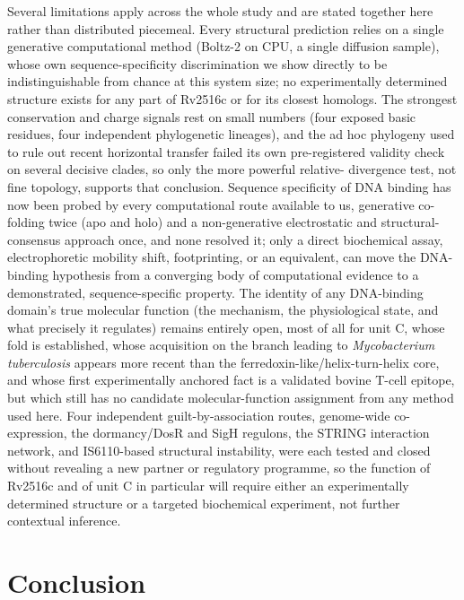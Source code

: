 \documentclass[11pt,a4paper]{article}
\newcommand{\mtb}{\textit{Mycobacterium tuberculosis}}
\begin{document}
Several limitations apply across the whole study and are stated together here rather than
distributed piecemeal. Every structural prediction relies on a single generative computational
method (Boltz-2 on CPU, a single diffusion sample), whose own sequence-specificity discrimination we
show directly to be indistinguishable from chance at this system size; no experimentally determined
structure exists for any part of Rv2516c or for its closest homologs. The strongest conservation and
charge signals rest on small numbers (four exposed basic residues, four independent phylogenetic
lineages), and the ad hoc phylogeny used to rule out recent horizontal transfer failed its own
pre-registered validity check on several decisive clades, so only the more powerful relative-
divergence test, not fine topology, supports that conclusion. Sequence specificity of DNA binding
has now been probed by every computational route available to us, generative co-folding twice
(apo and holo) and a non-generative electrostatic and structural-consensus approach once, and none
resolved it; only a direct biochemical assay, electrophoretic mobility shift, footprinting, or an
equivalent, can move the DNA-binding hypothesis from a converging body of computational evidence to
a demonstrated, sequence-specific property. The identity of any DNA-binding domain's true
molecular function (the mechanism, the physiological state, and what precisely it regulates) remains
entirely open, most of all for unit C, whose fold is established, whose acquisition on the branch
leading to \mtb{} appears more recent than the ferredoxin-like/helix-turn-helix core, and whose
first experimentally anchored fact is a validated bovine T-cell epitope, but which still has no
candidate molecular-function assignment from any method used here. Four independent
guilt-by-association routes, genome-wide co-expression, the dormancy/DosR and SigH regulons, the
STRING interaction network, and IS6110-based structural instability, were each tested and closed
without revealing a new partner or regulatory programme, so the function of Rv2516c and of unit C in
particular will require either an experimentally determined structure or a targeted biochemical
experiment, not further contextual inference.

\section{Conclusion}
\end{document}
